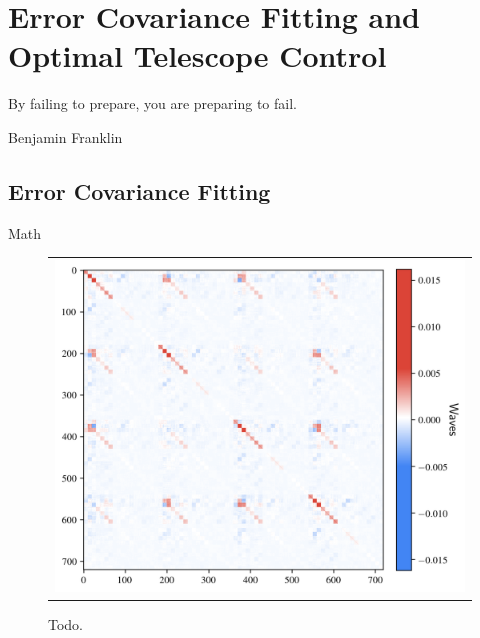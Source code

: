 \chapter{Error Covariance Fitting and Optimal Telescope Control}
\label{chap:err}

\epigraph{By failing to prepare, you are preparing to fail.}{Benjamin Franklin}

\section{Error Covariance Fitting}

Math

\begin{figure}[!htbp]
\begin{center}
\begin{tabular}{c}
\includegraphics[width=\textwidth]{figs/control/obs_cov_written_thesis.png}
\end{tabular}
\end{center}
\caption[Todo]{Todo.\label{fig:control-algo}}
\end{figure}

